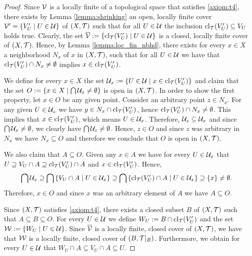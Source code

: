 \begin{proof}
	Since $\cover[V]$ is a locally finite of a topological space that satisfies \ref{axiom:t4}, there exists by Lemma \ref{lemma:shrinking} an open, locally finite cover $\cover[V]^\prime = \Bbraces{V^\prime_U \mid U \in \cover}$ of $\tspace$ such that for all $U \in \cover$ the inclusion $\cl{V^\prime_U} \subseteq V_U$ holds true. Clearly, the set $\overline{\cover[V]} := \Bbraces{\cl{V^\prime_U} \mid U \in \cover}$ is a closed, locally finite cover of $\tspace$. Hence, by Lemma \ref{lemma:loc_fin_nbhd}, there exists for every $x \in X$ a neighborhood $N_x$ of $x$ in $\tspace$, such that for all $U \in \cover$ we have that $\cl{V_U^\prime} \cap N_x \neq \emptyset$ implies $x \in \cl{V^\prime_U}$. 
	
	We define for every $x \in X$ the set $\cover_x := \Bbraces{U \in \cover \mid x \in \cl{V^\prime_U}}$ and claim that the set $O := \Bbraces{x \in X \mid \bigcap \cover_x \neq \emptyset}$ is open in $\tspace$. In order to show the first property, let $x \in O$ be any given point. Consider an arbitrary point $z \in N_x$. For any given $U \in \cover_z$ we have $y \in N_x \cap \cl{V^\prime_U}$, hence $\cl{V^\prime_U} \cap N_x \neq \emptyset$. This implies that $x \in \cl{V^\prime_U}$, which means $U \in \cover_x$. Therefore, $\cover_z \subseteq \cover_x$ and since $\bigcap \cover_x \neq \emptyset$, we clearly have $\bigcap \cover_z \neq \emptyset$. Hence, $z \in O$ and since $z$ was arbitrary in $N_x$ we have $N_x \subseteq O$ and therefore we conclude that $O$ is open in $\tspace$. 
	
	We also claim that $A \subseteq O$. Given any $x \in A$ we have for every $U \in \cover_x$ that $U \supseteq V_U \cap A \supseteq \cl{V^\prime_U} \cap A$ and $x \in \cl{V^\prime_U}$. Hence, 
	\begin{align*}
	\bigcap \cover_x \supseteq \bigcap \Bbraces{V_U \cap A \mid U \in \cover_x} \supseteq \bigcap \Bbraces{\cl{V^\prime_U} \cap A \mid U \in \cover_x} \supseteq \Bbraces{x} \neq \emptyset. 
	\end{align*}
	Therefore, $x \in O$ and since $x$ was an arbitrary element of $A$ we have $A \subseteq O$. 
	
	Since $\tspace$ satisfies \ref{axiom:t4}, there exists a closed subset $B$ of $\tspace$ such that $A \subseteq B \subseteq O$. For every $U \in \cover$ we define $W_U := B \cap \cl{V^\prime_U}$ and the set $\cover[W] := \Bbraces{W_U \mid U \in \cover}$. Since $\overline{\cover[V]}$ is a locally finite, closed cover of $\tspace$, we have that $\cover[W]$ is a locally finite, closed cover of $\reltspace[B]$. Furthermore, we obtain for every $U \in \cover$ that $W_U \cap A \subseteq V_U \cap A \subseteq U$. 
	

\end{proof}
